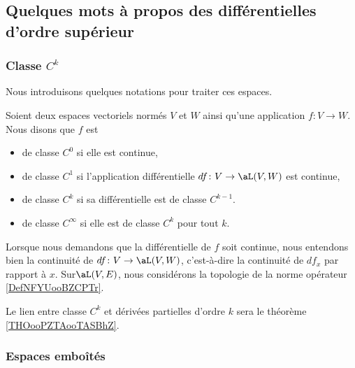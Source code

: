 \subsection{Quelques mots à propos des différentielles d'ordre supérieur}

\subsubsection{Classe \( C^k\)}


Nous introduisons quelques notations pour traiter ces espaces.

\begin{definition}  \label{DefPNjMGqy}
	Soient deux espaces vectoriels normés \( V\) et \( W\) ainsi qu'une application \( f\colon V\to W\). Nous disons que \( f\) est
	\begin{itemize}
		\item de classe  \( C^0\) si elle est continue,
		\item de classe \( C^1\) si l'application différentielle \( df\colon V\to \aL(V,W)\) est continue,
		\item de classe \( C^k\) si sa différentielle est de classe \( C^{k-1}\).
		\item de classe \( C^{\infty}\) si elle est de classe \( C^k\) pour tout \( k\).
	\end{itemize}

	Lorsque nous demandons que la différentielle de \( f\) soit continue, nous entendons bien la continuité de \( df\colon V\to \aL(V,W)\), c'est-à-dire la continuité de \( df_x\) par rapport à \( x\). Sur\( \aL(V,E)\), nous considérons la topologie de la norme opérateur \ref{DefNFYUooBZCPTr}.

\end{definition}
Le lien entre classe \( C^k\) et dérivées partielles d'ordre \( k\) sera le théorème \ref{THOooPZTAooTASBhZ}.


\subsubsection{Espaces emboîtés}



